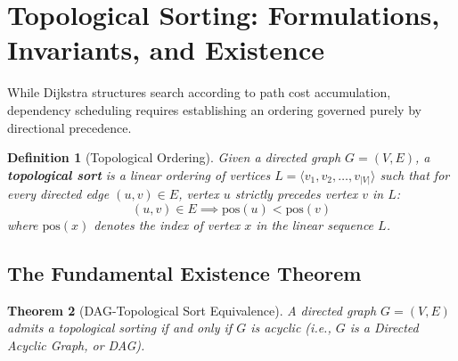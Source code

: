 \documentclass[10pt,journal,compsoc,onecolumn]{IEEEtran}
\newtheorem{theorem}{Theorem}
\newtheorem{definition}[theorem]{Definition}
\begin{document}
\section{Topological Sorting: Formulations, Invariants, and Existence}
\label{sec:topological_foundations}

While Dijkstra structures search according to path cost accumulation, dependency scheduling requires establishing an ordering governed purely by directional precedence.

\begin{definition}[Topological Ordering]
Given a directed graph $G = (V, E)$, a \textbf{topological sort} is a linear ordering of vertices $L = \langle v_1, v_2, \dots, v_{|V|} \rangle$ such that for every directed edge $(u, v) \in E$, vertex $u$ strictly precedes vertex $v$ in $L$:
\begin{equation}
(u, v) \in E \implies \text{pos}(u) < \text{pos}(v)
\end{equation}
where $\text{pos}(x)$ denotes the index of vertex $x$ in the linear sequence $L$.
\end{definition}

\subsection{The Fundamental Existence Theorem}
\begin{theorem}[DAG-Topological Sort Equivalence]
A directed graph $G = (V, E)$ admits a topological sorting if and only if $G$ is acyclic (i.e., $G$ is a Directed Acyclic Graph, or DAG).
\end{theorem}
\end{document}
